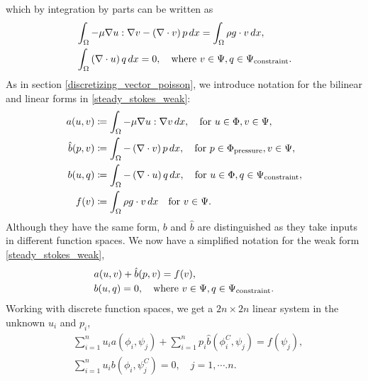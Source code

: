 \documentclass[11pt,a4paper]{memoir}
\newcommand{\om}{{\Omega}}
\begin{document}
which by integration by parts can be written as
\begin{equation}\label{steady_stokes_weak}
\begin{split}
    &\int_\om -\mu\nabla u : \nabla v - \left(\nabla\cdot v\right)p\,dx = \int_\om \rho g\cdot v\,dx,\\
    &\int_\om \left(\nabla\cdot u\right) q\,dx = 0, \quad\text{where $v \in \Psi, q \in \trialconstraint$}.
\end{split}
\end{equation}
As in section \ref{discretizing_vector_poisson}, we introduce notation for the bilinear and linear forms in \eqref{steady_stokes_weak}:
\begin{equation}
\begin{split}
    a(u, v) &\coloneqq \int_\om-\mu\nabla u : \nabla v\,dx,\quad\text{for $u \in \Phi, v \in \Psi$},\\
    \hat{b}(p, v) &\coloneqq \int_\om-\left(\nabla\cdot v\right)p\,dx,\quad\text{for $p \in \testpressure, v \in \Psi$},\\
    b(u, q) &\coloneqq \int_\om-\left(\nabla\cdot u\right)q\,dx,\quad\text{for $u \in \Phi, q \in \trialconstraint$},\\
    f(v) &\coloneqq \int_\om \rho g\cdot v\,dx\quad\text{for $v \in \Psi$}.
\end{split}
\end{equation}
Although they have the same form, $b$ and $\hat{b}$ are distinguished as they take inputs in different function spaces.
We now have a simplified notation for the weak form \eqref{steady_stokes_weak},
\begin{equation}\label{steady_stokes_weak_notation}
\begin{split}
    &a(u, v) + \hat{b}(p, v) = f(v),\\
    &b(u, q) = 0, \quad\text{where $v \in \Psi, q \in {\Psi_{\text{constraint}}}$}.
\end{split}
\end{equation}
Working with discrete function spaces, we get a $2n\times 2n$ linear system in the unknown $u_i$ and $p_i$,
\begin{equation}\label{steady_stokes_weak_notation}
\begin{split}
    &\sum_{i=1}^n u_i a\left(\phi_i, \psi_j\right) + \sum_{i=1}^np_i\hat{b}\left(\phi^C_i, \psi_j\right) = f(\psi_j),\\
    &\sum_{i=1}^nu_ib\left(\phi_i, \psi^C_j\right) = 0,\quad j=1,\cdots.n.
\end{split}
\end{equation}
\end{document}
